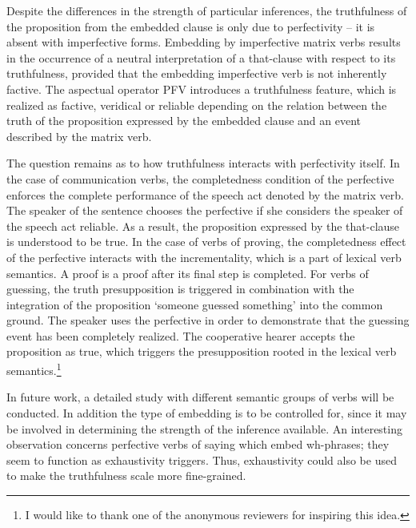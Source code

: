 \documentclass[output=paper,  modfonts,  newtxmath,  hidelinks		  ]{langscibook}
\begin{document}
Despite the differences in the strength of particular inferences, the truthfulness of the proposition from the embedded clause is only due to perfectivity – it is absent with imperfective forms. Embedding by imperfective matrix verbs results in the occurrence of a neutral interpretation of a that-clause with respect to its truthfulness, provided that the embedding imperfective verb is not inherently factive. The aspectual operator PFV introduces a truthfulness feature, which is realized as factive, veridical or reliable depending on the relation between the truth of the proposition expressed by the embedded clause and an event described by the matrix verb.

The question remains as to how truthfulness interacts with perfectivity itself. In the case of communication verbs, the completedness condition of the perfective enforces the complete performance of the speech act denoted by the matrix verb. The speaker of the sentence chooses the perfective if she considers the speaker of the speech act reliable. As a result, the proposition expressed by the that-clause is understood to be true. In the case of verbs of proving, the completedness effect of the perfective interacts with the incrementality, which is a part of lexical verb semantics. A proof is a proof after its final step is completed. For verbs of guessing, the truth presupposition is triggered in combination with the integration of the proposition `someone guessed something' into the common ground. The speaker uses the perfective in order to demonstrate that the guessing event has been completely realized. The cooperative hearer accepts the proposition as true, which triggers the presupposition rooted in the lexical verb semantics.\footnote{I would like to thank one of the anonymous reviewers for inspiring this idea.}

In future work, a detailed study with different semantic groups of verbs will be conducted. In addition the type of embedding is to be controlled for, since it may be involved in determining the strength of the inference available. An interesting observation concerns perfective verbs of saying which embed wh-phrases; they seem to function as exhaustivity triggers. Thus, exhaustivity could also be used to make the truthfulness scale more fine-grained.
 
\end{document}
